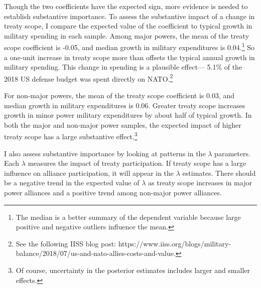 \documentclass[12pt]{article}
\begin{document}
Though the two coefficients have the expected sign, more evidence is needed to establish substantive importance. 
To assess the substantive impact of a change in treaty scope, I compare the expected value of the coefficient to typical growth in military spending in each sample. 
Among major powers, the mean of the treaty scope coefficient is -0.05, and median growth in military expenditures is 0.04.\footnote{The median is a better summary of the dependent variable because large positive and negative outliers influence the mean.} 
So a one-unit increase in treaty scope more than offsets the typical annual growth in military spending. 
This change in spending is a plausible effect--- 5.1\% of the 2018 US defense budget was spent directly on NATO.\footnote{See the following IISS blog post: https://www.iiss.org/blogs/military-balance/2018/07/us-and-nato-allies-costs-and-value.} 


For non-major powers, the mean of the treaty scope coefficient is 0.03, and median growth in military expenditures is 0.06. 
Greater treaty scope increases growth in minor power military expenditures by about half of typical growth. 
In both the major and non-major power samples, the expected impact of higher treaty scope has a large substantive effect.\footnote{Of course, uncertainty in the posterior estimates includes larger and smaller effects.}


I also assess substantive importance by looking at patterns in the $\lambda$ parameters. 
Each $\lambda$ measures the impact of treaty participation. 
If treaty scope has a large influence on alliance participation, it will appear in the $\lambda$ estimates. 
There should be a negative trend in the expected value of $\lambda$ as treaty scope increases in major power alliances and a positive trend among non-major power alliances. 
\end{document}

